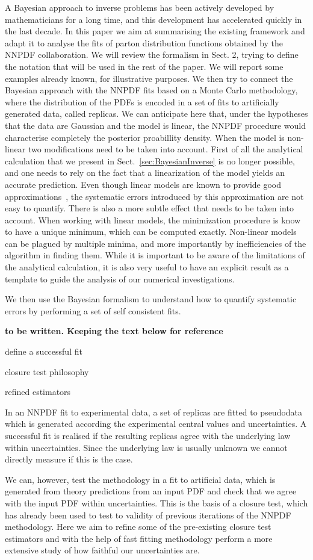 A Bayesian approach to inverse problems has been actively developed by
mathematicians for a long time, and this development has accelerated quickly in
the last decade. In this paper we aim at summarising the existing framework and
adapt it to analyse the fits of parton distribution functions obtained by the
NNPDF collaboration. We will review the formalism in Sect. 2, trying to define
the notation that will be used in the rest of the paper. We will report some
examples already known, for illustrative purposes. We then try to connect the
Bayesian approach with the NNPDF fits based on a Monte Carlo methodology, where
the distribution of the PDFs is encoded in a set of fits to artificially
generated data, called replicas. We can anticipate here that, under the
hypotheses that the data are Gaussian and the model is linear, the NNPDF
procedure would characterise completely the posterior proabillity density. When
the model is non-linear two modifications need to be taken into account. First
of all the analytical calculation that we present in
Sect.~\ref{sec:BayesianInverse} is no longer possible, and one needs to rely on
the fact that a linearization of the model yields an accurate prediction. Even
though linear models are known to provide good approximations~\cite{xxx}, the
systematic errors introduced by this approximation are not easy to quantify.
There is also a more subtle effect that needs to be taken into account. When
working with linear models, the minimization procedure is know to have a unique
minimum, which can be computed exactly. Non-linear models can be plagued by
multiple minima, and more importantly by inefficiencies of the algorithm in
finding them. While it is important to be aware of the limitations of the
analytical calculation, it is also very useful to have an explicit result as a
template to guide the analysis of our numerical investigations. 



We then use the Bayesian formalism to understand how to quantify systematic
errors by performing a set of self consistent fits.

{\bf to be written. Keeping the text below for reference}

define a successful fit 

closure test philosophy

refined estimators

In an NNPDF fit to experimental data, a set of replicas are fitted to pseudodata
which is generated according the experimental central values and uncertainties.
A successful fit is realised if the resulting replicas agree with the underlying
law within uncertainties. Since the underlying law is usually unknown we cannot
directly measure if this is the case.

We can, however, test the methodology in a fit to artificial data, which is
generated from theory predictions from an input PDF and check that we agree with
the input PDF within uncertainties. This is the basis of a closure test, which
has already been used to test to validity of previous iterations of the NNPDF
methodology. Here we aim to refine some of the pre-existing closure test
estimators and with the help of fast fitting methodology perform a more
extensive study of how faithful our uncertainties are.
